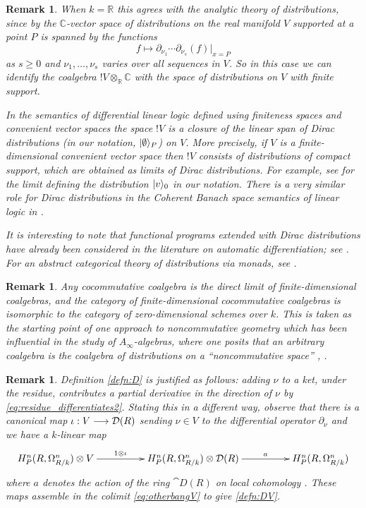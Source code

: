 \documentclass[english,letter paper,12pt,reqno]{article}
\DeclarePairedDelimiter\ket{\lvert}{\rangle}
\theoremstyle{example}
\newtheorem{remark}[theorem]{Remark}
\def\be{\begin{equation}}
\def\ee{\end{equation}}
\begin{document}
\begin{remark}\label{remark:distr} When $k = \mathbb{R}$ this agrees with the analytic theory of distributions, since by \cite[Theorem 3.2.1]{friedlander} the $\mathbb{C}$-vector space of distributions on the real manifold $V$ supported at a point $P$ is spanned by the functions
\[
f \longmapsto \partial_{\nu_1} \cdots \partial_{\nu_s}(f)|_{x=P}
\]
as $s \ge 0$ and $\nu_1,\ldots,\nu_s$ varies over all sequences in $V$. So in this case we can identify the coalgebra ${!} V \otimes_{\mathbb{R}} \mathbb{C}$ with the space of distributions on $V$ with finite support.

In the semantics of differential linear logic defined using finiteness spaces \cite{ehrhard-finiteness} and convenient vector spaces \cite{blutecon} the space ${!} V$ is a closure of the linear span of Dirac distributions (in our notation, $\ket{\emptyset}_P$) on $V$. More precisely, if $V$ is a finite-dimensional convenient vector space then ${!} V$ consists of distributions of compact support, which are obtained as limits of Dirac distributions. For example, see \cite[Theorem 5.7]{blutecs} for the limit defining the distribution $\ket{v}_0$ in our notation. There is a very similar role for Dirac distributions in the Coherent Banach space semantics of linear logic in \cite[\S 3.2]{girard_banach}. 

It is interesting to note that functional programs extended with Dirac distributions have already been considered in the literature on automatic differentiation; see \cite{nilsson}. For an abstract categorical theory of distributions via monads, see \cite{kock}.
\end{remark}

\begin{remark}
Any cocommutative coalgebra is the direct limit of finite-dimensional coalgebras, and the category of finite-dimensional cocommutative coalgebras is isomorphic to the category of zero-dimensional schemes over $k$. This is taken as the starting point of one approach to noncommutative geometry which has been influential in the study of $A_\infty$-algebras, where one posits that an arbitrary coalgebra is the coalgebra of distributions on a ``noncommutative space'' \cite[p.15]{kontnc}, \cite{kontnc2, lebruyn}.
\end{remark}

\begin{remark}\label{remark:justify}
Definition \ref{defn:D} is justified as follows: adding $\nu$ to a ket, under the residue, contributes a partial derivative in the direction of $\nu$ by \eqref{eq:residue_differentiates2}. Stating this in a different way, observe that there is a canonical map $\iota: V \longrightarrow \mathcal{D}(R)$ sending $\nu \in V$ to the differential operator $\partial_\nu$ and we have a $k$-linear map
\be
\xymatrix@C+2pc{
H^n_P(R, \Omega^n_{R/k}) \otimes V \ar[r]^-{1 \otimes \iota} & H^n_P(R, \Omega^n_{R/k}) \otimes \cat{D}(R) \ar[r]^-{a} & H^n_P(R, \Omega^n_{R/k})
}
\ee
where $a$ denotes the action of the ring $\cat{D}(R)$ on local cohomology \cite[Lemma 2.7]{murfet_coalg}. These maps assemble in the colimit \eqref{eq:otherbangV} to give \eqref{defn:DV}.
\end{remark}
\end{document}
